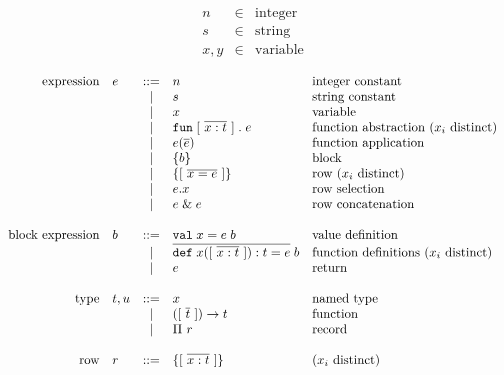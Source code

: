 \documentclass[11pt]{article}
\begin{document}
\[
\begin{array}{lcl}
n & \in & \text{integer} \\
s & \in & \text{string} \\
x, y & \in & \text{variable} \\
\end{array}
\]
\[
\begin{array}{rlcll}
\text{expression}
  & e & ::= & n                      & \text{integer constant} \\
  &   & |   & s                      & \text{string constant} \\
  &   & |   & x                      & \text{variable} \\
  &   & |   & \mathtt{fun}\;[\ \overline{x : t}\ ]\;.\;e   & \text{function abstraction ($x_i$ distinct)} \\
  &   & |   & e(\overline{e})             & \text{function application} \\
  &   & |   & \{ b \}                      & \text{block} \\
  &   & |   & \{ [\ \overline{x = e}\ ] \}                   & \text{row ($x_i$ distinct)} \\
  &   & |   & e . x                   & \text{row selection} \\
  &   & |   & e\;\&\;e                   & \text{row concatenation} \\
\\
\text{block expression}
  & b & ::= & \mathtt{val}\;x = e\;b                 & \text{value definition} \\
  &   & |   & \overline{\mathtt{def}\;x([\ \overline{x : t}\ ]) : t = e}\;b   & \text{function definitions ($x_i$ distinct)} \\
  &   & |   & e                       & \text{return} \\
\\
\text{type}
  & t, u & ::=  & x             & \text{named type} \\
  &      & |   & ([\ \overline{t}\ ]) -> t & \text{function} \\
  &      & |   & \Pi\ r          & \text{record} \\
\\
\text{row}
  & r & ::= & \{ [\ \overline{x : t}\ ] \}       & \text{($x_i$ distinct)}
\end{array}
\]
\end{document}
